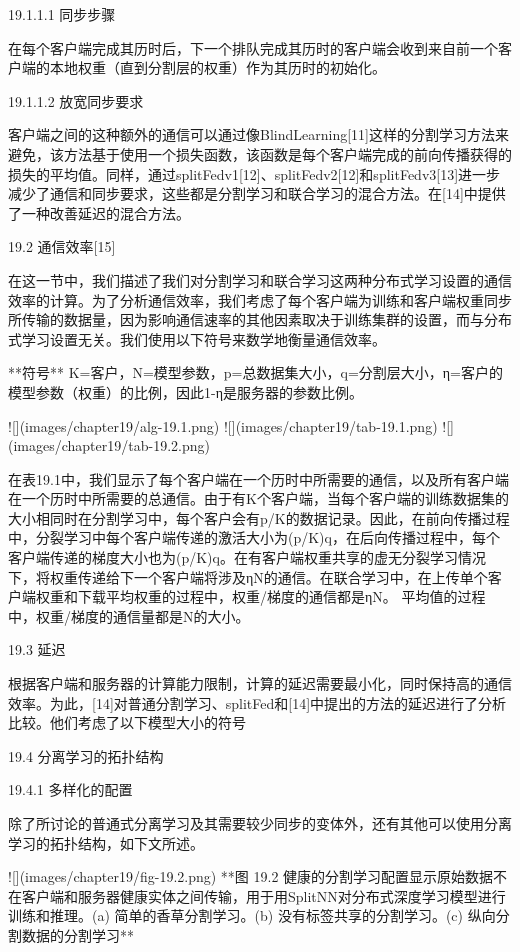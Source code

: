 19.1.1.1 同步步骤

在每个客户端完成其历时后，下一个排队完成其历时的客户端会收到来自前一个客户端的本地权重（直到分割层的权重）作为其历时的初始化。

19.1.1.2 放宽同步要求

客户端之间的这种额外的通信可以通过像BlindLearning[11]这样的分割学习方法来避免，该方法基于使用一个损失函数，该函数是每个客户端完成的前向传播获得的损失的平均值。同样，通过splitFedv1[12]、splitFedv2[12]和splitFedv3[13]进一步减少了通信和同步要求，这些都是分割学习和联合学习的混合方法。在[14]中提供了一种改善延迟的混合方法。

 19.2 通信效率[15]

在这一节中，我们描述了我们对分割学习和联合学习这两种分布式学习设置的通信效率的计算。为了分析通信效率，我们考虑了每个客户端为训练和客户端权重同步所传输的数据量，因为影响通信速率的其他因素取决于训练集群的设置，而与分布式学习设置无关。我们使用以下符号来数学地衡量通信效率。

**符号** K=客户，N=模型参数，p=总数据集大小，q=分割层大小，η=客户的模型参数（权重）的比例，因此1-η是服务器的参数比例。

![](images/chapter19/alg-19.1.png)
![](images/chapter19/tab-19.1.png)
![](images/chapter19/tab-19.2.png)

在表19.1中，我们显示了每个客户端在一个历时中所需要的通信，以及所有客户端在一个历时中所需要的总通信。由于有K个客户端，当每个客户端的训练数据集的大小相同时在分割学习中，每个客户会有p/K的数据记录。因此，在前向传播过程中，分裂学习中每个客户端传递的激活大小为(p/K)q，在后向传播过程中，每个客户端传递的梯度大小也为(p/K)q。在有客户端权重共享的虚无分裂学习情况下，将权重传递给下一个客户端将涉及ηN的通信。在联合学习中，在上传单个客户端权重和下载平均权重的过程中，权重/梯度的通信都是ηN。
平均值的过程中，权重/梯度的通信量都是N的大小。

19.3 延迟

根据客户端和服务器的计算能力限制，计算的延迟需要最小化，同时保持高的通信效率。为此，[14]对普通分割学习、splitFed和[14]中提出的方法的延迟进行了分析比较。他们考虑了以下模型大小的符号

19.4 分离学习的拓扑结构

19.4.1 多样化的配置

除了所讨论的普通式分离学习及其需要较少同步的变体外，还有其他可以使用分离学习的拓扑结构，如下文所述。

![](images/chapter19/fig-19.2.png)
**图 19.2 健康的分割学习配置显示原始数据不在客户端和服务器健康实体之间传输，用于用SplitNN对分布式深度学习模型进行训练和推理。(a) 简单的香草分割学习。(b) 没有标签共享的分割学习。(c) 纵向分割数据的分割学习**

